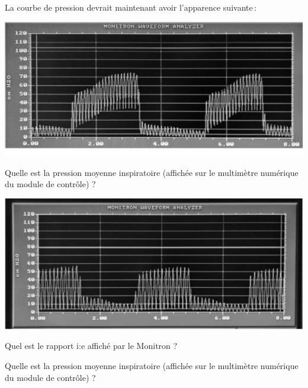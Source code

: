 \begin{exercice}
	La courbe de pression devrait maintenant avoir l'apparence suivante :

	\centerline{\includegraphics{img/exr-controle1.pdf}}

	Quelle est la pression moyenne inspiratoire (affichée sur le multimètre numérique du module de contrôle) ?
	\shortanswer{\cmh}


		\centerline{\includegraphics{img/exr-controle2.pdf}}

		Quel est le rapport i:e affiché par le Monitron ? \shortanswer{\cmh}

		Quelle est la pression moyenne inspiratoire (affichée sur le multimètre numérique du module de contrôle) ?

		\shortanswer{\cmh}
\end{exercice}
